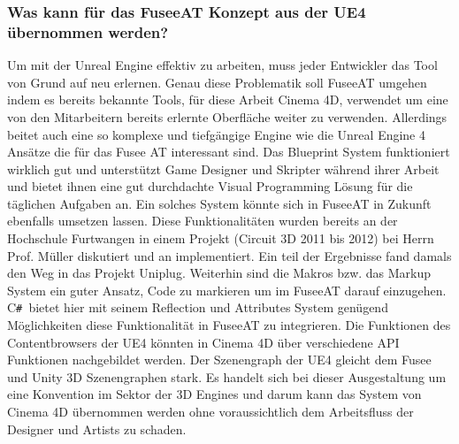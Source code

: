 \documentclass[pagesize, paper=a4, fontsize=12pt, titlepage=true, headings=small, headnosepline, abstractoff, liststotoc, nochapterprefix, plainheadsepline, twoside]{scrreprt}
\newcommand{\CSS}{C\texttt{\# }}
\begin{document}
\subsubsection{Was kann für das FuseeAT Konzept aus der UE4 übernommen werden?}
Um mit der Unreal Engine effektiv zu arbeiten, muss jeder Entwickler das Tool von Grund auf neu erlernen. Genau diese Problematik soll FuseeAT umgehen indem es bereits bekannte Tools, für diese Arbeit Cinema 4D, verwendet um eine von den Mitarbeitern bereits erlernte Oberfläche weiter zu verwenden. Allerdings beitet auch eine so komplexe und tiefgängige Engine wie die Unreal Engine 4 Ansätze die für das Fusee AT interessant sind. Das Blueprint System funktioniert wirklich gut und unterstützt Game Designer und Skripter während ihrer Arbeit und bietet ihnen eine gut durchdachte Visual Programming Lösung für die täglichen Aufgaben an. Ein solches System könnte sich in FuseeAT in Zukunft ebenfalls umsetzen lassen. Diese Funktionalitäten wurden bereits an der Hochschule Furtwangen in einem Projekt (Circuit 3D 2011 bis 2012) bei Herrn Prof. Müller diskutiert und an implementiert. Ein teil der Ergebnisse fand damals den Weg in das Projekt Uniplug.
Weiterhin sind die Makros bzw. das Markup System ein guter Ansatz, Code zu markieren um im FuseeAT darauf einzugehen. \CSS bietet hier mit seinem Reflection und Attributes System genügend Möglichkeiten diese Funktionalität in FuseeAT zu integrieren. Die Funktionen des Contentbrowsers der UE4 könnten in Cinema 4D über verschiedene API Funktionen nachgebildet werden. Der Szenengraph der UE4 gleicht dem Fusee und Unity 3D Szenengraphen stark. Es handelt sich bei dieser Ausgestaltung um eine Konvention im Sektor der 3D Engines und darum kann das System von Cinema 4D übernommen werden ohne voraussichtlich dem Arbeitsfluss der Designer und Artists zu schaden.


\end{document}

